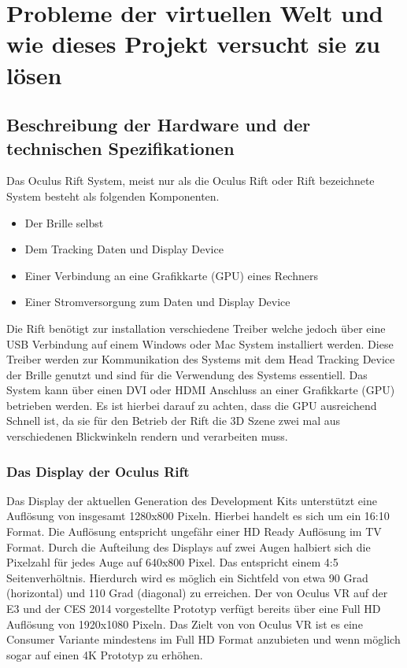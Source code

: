 \documentclass[pagesize, paper=a4, fontsize=12pt,titlepage=true, headings=small, headnosepline, abstractoff, liststotoc, nochapterprefix, plainheadsepline]{scrreprt}
\begin{document}
\chapter{Probleme der virtuellen Welt und wie dieses Projekt versucht sie zu lösen}
\section{Beschreibung der Hardware und der technischen Spezifikationen}
Das Oculus Rift System, meist nur als die Oculus Rift oder Rift bezeichnete System besteht als folgenden Komponenten.
\begin{itemize}
\item Der Brille selbst
\item Dem Tracking Daten und Display Device
\item Einer Verbindung an eine Grafikkarte (GPU) eines Rechners
\item Einer Stromversorgung zum Daten und Display Device
\end{itemize}
Die Rift benötigt zur installation verschiedene Treiber welche jedoch über eine USB Verbindung auf einem Windows oder Mac System installiert werden. Diese Treiber werden zur Kommunikation des Systems mit dem Head Tracking Device der Brille genutzt und sind für die Verwendung des Systems essentiell. Das System kann über einen DVI oder HDMI Anschluss an einer Grafikkarte (GPU) betrieben werden. Es ist hierbei darauf zu achten, dass die GPU ausreichend Schnell ist, da sie für den Betrieb der Rift die 3D Szene zwei mal aus verschiedenen Blickwinkeln rendern und verarbeiten muss.

\subsection{Das Display der Oculus Rift}
Das Display der aktuellen Generation des Development Kits unterstützt eine Auflösung von insgesamt 1280x800 Pixeln. Hierbei handelt es sich um ein 16:10 Format. Die Auflösung entspricht ungefähr einer HD Ready Auflösung im TV Format. Durch die Aufteilung des Displays auf zwei Augen halbiert sich die Pixelzahl für jedes Auge auf 640x800 Pixel. Das entspricht einem 4:5 Seitenverhöltnis. Hierdurch wird es möglich ein Sichtfeld von etwa 90 Grad (horizontal) und 110 Grad (diagonal) zu erreichen. Der von Oculus VR auf der E3 und der CES 2014 vorgestellte Prototyp verfügt bereits über eine Full HD Auflösung von 1920x1080 Pixeln. Das Zielt von von Oculus VR ist es eine Consumer Variante mindestens im Full HD Format anzubieten und wenn möglich sogar auf einen 4K Prototyp zu erhöhen.
\end{document}
